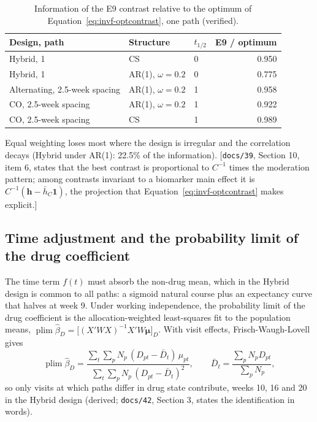\documentclass[11pt]{article}
\newcommand{\note}[1]{\textcolor{blue!60!black}{\small [#1]}}
\newcommand{\code}[1]{\texttt{#1}}
\begin{document}
\begin{table}[h]
\centering\small
\caption{Information of the E9 contrast relative to the optimum of
Equation~\eqref{eq:invf-optcontrast}, one path (verified).}
\label{tab:invf-opt}
\begin{tabular}{@{}lllr@{}}
\toprule
Design, path & Structure & $t_{1/2}$ & E9 / optimum \\
\midrule
Hybrid, 1 & CS & 0 & 0.950 \\
Hybrid, 1 & AR(1), $\omega = 0.2$ & 0 & 0.775 \\
Alternating, 2.5-week spacing & AR(1), $\omega = 0.2$ & 1 & 0.958 \\
CO, 2.5-week spacing & AR(1), $\omega = 0.2$ & 1 & 0.922 \\
CO, 2.5-week spacing & CS & 1 & 0.989 \\
\bottomrule
\end{tabular}
\end{table}

\noindent Equal weighting loses most where the design is irregular and
the correlation decays (Hybrid under AR(1): 22.5\% of the information).
\note{\code{docs/39}, Section 10, item 6, states that the best contrast
is proportional to $C^{-1}$ times the moderation pattern; among
contrasts invariant to a biomarker main effect it is
$C^{-1}(\mathbf h - \bar h_C\mathbf 1)$, the projection that
Equation~\eqref{eq:invf-optcontrast} makes explicit.}

\subsection{Time adjustment and the probability limit of the drug
coefficient}

The time term $f(t)$ must absorb the non-drug mean, which in the Hybrid
design is common to all paths: a sigmoid natural course plus an
expectancy curve that halves at week 9. Under working independence,
the probability limit of the drug coefficient is the allocation-weighted
least-squares fit to the population means, $\operatorname{plim}
\hat\beta_D = \big[(X'WX)^{-1}X'W\boldsymbol\mu\big]_D$. With visit
effects, Frisch-Waugh-Lovell gives
\begin{equation}
\operatorname{plim}\hat\beta_D
  = \frac{\sum_t\sum_p N_p\,(D_{pt} - \bar D_t)\,\mu_{pt}}
         {\sum_t\sum_p N_p\,(D_{pt} - \bar D_t)^2},
  \qquad \bar D_t = \frac{\sum_p N_p D_{pt}}{\sum_p N_p},
\label{eq:bp-fwl}
\end{equation}
so only visits at which paths differ in drug state contribute, weeks
10, 16 and 20 in the Hybrid design (derived; \code{docs/42}, Section 3,
states the identification in words).
\end{document}
